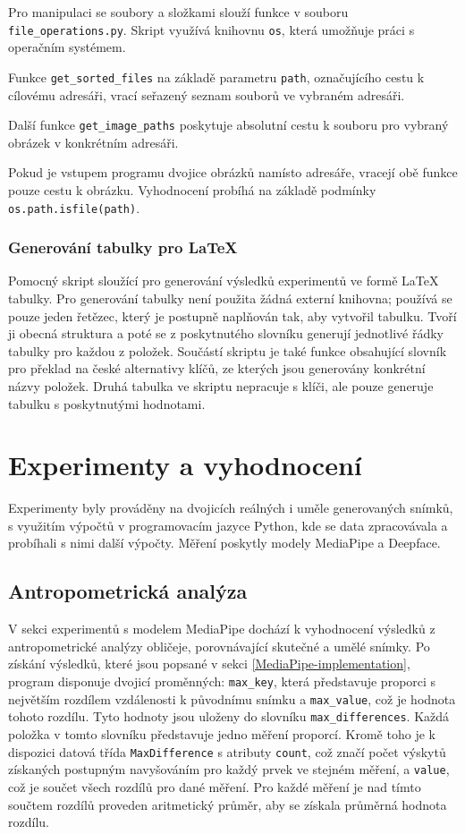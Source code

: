 Pro manipulaci se soubory a složkami slouží funkce v souboru \texttt{file\_operations.py}. Skript využívá knihovnu \texttt{os}, která umožňuje práci s operačním systémem.

Funkce \texttt{get\_sorted\_files} na základě parametru \texttt{path}, označujícího cestu k cílovému adresáři, vrací seřazený seznam souborů ve vybraném adresáři.

Další funkce \texttt{get\_image\_paths} poskytuje absolutní cestu k souboru pro vybraný obrázek v konkrétním adresáři.

Pokud je vstupem programu dvojice obrázků namísto adresáře, vracejí obě funkce pouze cestu k obrázku. Vyhodnocení probíhá na základě podmínky \texttt{os.path.isfile(path)}.

\subsection*{Generování tabulky pro \LaTeX}

Pomocný skript sloužící pro generování výsledků experimentů ve formě \LaTeX{} tabulky. Pro generování tabulky není použita žádná externí knihovna; používá se pouze jeden řetězec, který je postupně naplňován tak, aby vytvořil tabulku. Tvoří ji obecná struktura a poté se z poskytnutého slovníku generují jednotlivé řádky tabulky pro každou z položek. Součástí skriptu je také funkce obsahující slovník pro překlad na české alternativy klíčů, ze kterých jsou generovány konkrétní názvy položek. Druhá tabulka ve skriptu nepracuje s klíči, ale pouze generuje tabulku s poskytnutými hodnotami.

\chapter{Experimenty a vyhodnocení}

Experimenty byly prováděny na dvojicích reálných i uměle generovaných snímků, s využitím výpočtů v programovacím jazyce Python, kde se data zpracovávala a probíhali s nimi další výpočty. Měření poskytly modely MediaPipe a Deepface.

\section{Antropometrická analýza}

V sekci experimentů s modelem MediaPipe dochází k vyhodnocení výsledků z antropometrické analýzy obličeje, porovnávající skutečné a umělé snímky. Po získání výsledků, které jsou popsané v sekci \ref{MediaPipe-implementation}, program disponuje dvojicí proměnných: \texttt{max\_key}, která představuje proporci s největším rozdílem vzdálenosti k původnímu snímku a \texttt{max\_value}, což je hodnota tohoto rozdílu. Tyto hodnoty jsou uloženy do slovníku \texttt{max\_differences}. Každá položka v tomto slovníku představuje jedno měření proporcí. Kromě toho je k dispozici datová třída \texttt{MaxDifference} s atributy \texttt{count}, což značí počet výskytů získaných postupným navyšováním pro každý prvek ve stejném měření, a \texttt{value}, což je součet všech rozdílů pro dané měření. Pro každé měření je nad tímto součtem rozdílů proveden aritmetický průměr, aby se získala průměrná hodnota rozdílu.

